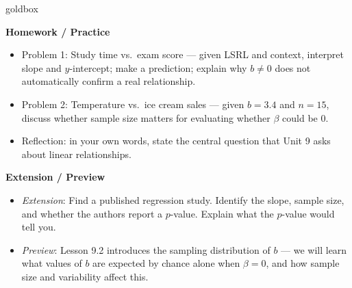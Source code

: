 \documentclass[10pt]{article}
\begin{document}
\begin{skillbox}{goldbox}
\begin{minipage}[t]{0.48\linewidth}
    \textbf{Homework / Practice}
    \begin{itemize}
        \item Problem 1: Study time vs.\ exam score --- given LSRL and context,
              interpret slope and $y$-intercept; make a prediction; explain why
              $b \ne 0$ does not automatically confirm a real relationship.
        \item Problem 2: Temperature vs.\ ice cream sales --- given $b = 3.4$ and
              $n = 15$, discuss whether sample size matters for evaluating
              whether $\beta$ could be 0.
        \item Reflection: in your own words, state the central question that Unit 9
              asks about linear relationships.
    \end{itemize}
\end{minipage}
\hfill
\begin{minipage}[t]{0.48\linewidth}
    \textbf{Extension / Preview}
    \begin{itemize}
        \item \textit{Extension}: Find a published regression study. Identify the
              slope, sample size, and whether the authors report a $p$-value.
              Explain what the $p$-value would tell you.
        \item \textit{Preview}: Lesson 9.2 introduces the sampling distribution of
              $b$ --- we will learn what values of $b$ are expected by chance alone
              when $\beta = 0$, and how sample size and variability affect this.
    \end{itemize}
\end{minipage}
\end{skillbox}
\end{document}
